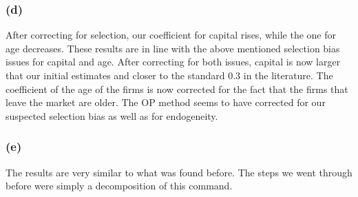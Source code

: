 \documentclass[11pt]{article}
\begin{document}
\subsubsection*{(d)}


\FloatBarrier
After correcting for selection, our coefficient for capital rises, while the one for age decreases. These results are in line with the above mentioned selection bias issues for capital and age. After correcting for both issues, capital is now larger that our initial estimates and closer to the standard 0.3 in the literature. The coefficient of the age of the firms is now corrected for the fact that the firms that leave the market are older. The OP method seems to have corrected for our suspected selection bias as well as for endogeneity. 

\subsubsection*{(e)}


The results are very similar to what was found before. The steps we went through before were simply a decomposition of this command.  
\end{document}
